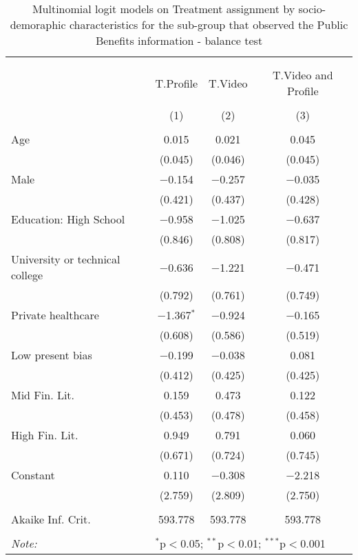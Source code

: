 
\begin{table}[H] \centering 
  \caption{Multinomial logit models on Treatment assignment by socio-demoraphic characteristics for the sub-group that observed the Public Benefits information - balance test} 
  \label{tbl:balance_public_online} 
\begin{tabular}{@{\extracolsep{5pt}}lccc} 
\\[-1.8ex]\hline 
\hline \\[-1.8ex] 
\\[-1.8ex] & T.Profile & T.Video & T.Video and Profile \\ 
\\[-1.8ex] & (1) & (2) & (3)\\ 
\hline \\[-1.8ex] 
 Age & 0.015 & 0.021 & 0.045 \\ 
  & (0.045) & (0.046) & (0.045) \\ 
  Male & $-$0.154 & $-$0.257 & $-$0.035 \\ 
  & (0.421) & (0.437) & (0.428) \\ 
  Education: High School & $-$0.958 & $-$1.025 & $-$0.637 \\ 
  & (0.846) & (0.808) & (0.817) \\ 
  University or technical college & $-$0.636 & $-$1.221 & $-$0.471 \\ 
  & (0.792) & (0.761) & (0.749) \\ 
  Private healthcare & $-$1.367$^{*}$ & $-$0.924 & $-$0.165 \\ 
  & (0.608) & (0.586) & (0.519) \\ 
  Low present bias & $-$0.199 & $-$0.038 & 0.081 \\ 
  & (0.412) & (0.425) & (0.425) \\ 
  Mid Fin. Lit. & 0.159 & 0.473 & 0.122 \\ 
  & (0.453) & (0.478) & (0.458) \\ 
  High Fin. Lit. & 0.949 & 0.791 & 0.060 \\ 
  & (0.671) & (0.724) & (0.745) \\ 
  Constant & 0.110 & $-$0.308 & $-$2.218 \\ 
  & (2.759) & (2.809) & (2.750) \\ 
 \hline \\[-1.8ex] 
Akaike Inf. Crit. & 593.778 & 593.778 & 593.778 \\ 
\hline 
\hline \\[-1.8ex] 
\textit{Note:}  & \multicolumn{3}{l}{$^{*}$p$<$0.05; $^{**}$p$<$0.01; $^{***}$p$<$0.001} \\ 
\end{tabular} 
\end{table} 

